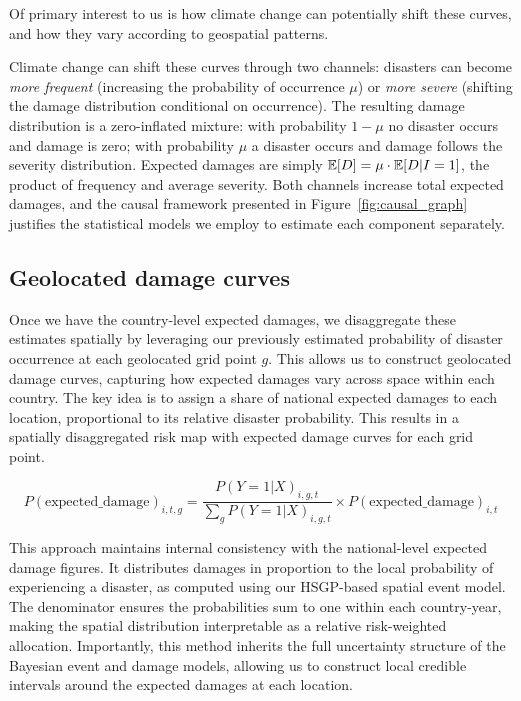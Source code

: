 Of primary interest to us is how climate change can potentially shift these curves, and how they vary according to geospatial patterns.

Climate change can shift these curves through two channels: disasters can become \textit{more frequent} (increasing the probability of occurrence $\mu$) or \textit{more severe} (shifting the damage distribution conditional on occurrence). The resulting damage distribution is a zero-inflated mixture: with probability $1 - \mu$ no disaster occurs and damage is zero; with probability $\mu$ a disaster occurs and damage follows the severity distribution. Expected damages are simply $\mathbb{E}[D] = \mu \cdot \mathbb{E}[D|I = 1]$, the product of frequency and average severity. Both channels increase total expected damages, and the causal framework presented in Figure~\ref{fig:causal_graph} justifies the statistical models we employ to estimate each component separately.

\subsection{Geolocated damage curves}

Once we have the country-level expected damages, we disaggregate these estimates spatially by leveraging our previously estimated probability of disaster occurrence at each geolocated grid point $g$. This allows us to construct geolocated damage curves, capturing how expected damages vary across space within each country. The key idea is to assign a share of national expected damages to each location, proportional to its relative disaster probability. This results in a spatially disaggregated risk map with expected damage curves for each grid point.

\begin{equation}
P(\text{expected\_damage})_{i,t,g} = \frac{P(Y=1|X)_{i,g,t}}{\sum_g P(Y=1|X)_{i,g,t}} \times P(\text{expected\_damage})_{i,t}
\end{equation}

This approach maintains internal consistency with the national-level expected damage figures. It distributes damages in proportion to the local probability of experiencing a disaster, as computed using our HSGP-based spatial event model. The denominator ensures the probabilities sum to one within each country-year, making the spatial distribution interpretable as a relative risk-weighted allocation. Importantly, this method inherits the full uncertainty structure of the Bayesian event and damage models, allowing us to construct local credible intervals around the expected damages at each location.


